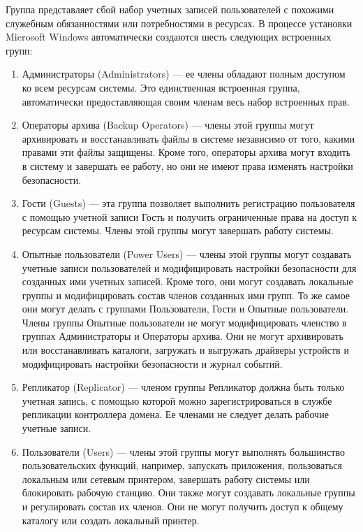 Группа  представляет сбой набор учетных записей пользователей с похожими служебным
обязанностями или потребностями в ресурсах. В процессе установки Microsoft Windows
автоматически создаются шесть следующих встроенных групп:
\begin{enumerate}

\item Администраторы (Administrators) --- ее члены обладают полным доступом
ко всем ресурсам системы. Это единственная встроенная группа,
автоматически предоставляющая своим членам весь набор встроенных прав.

\item Операторы архива (Backup Operators) --- члены этой группы могут
архивировать и восстанавливать файлы в системе независимо от того,
какими правами эти файлы защищены. Кроме того, операторы архива могут
входить в систему и завершать ее работу,
но они не имеют права изменять настройки безопасности.

\item Гости (Guests) --- эта группа позволяет выполнить регистрацию
пользователя с помощью учетной записи Гость и получить ограниченные
права на доступ к ресурсам системы.
Члены этой группы могут завершать работу системы.

\item Опытные пользователи (Power Users) --- члены этой группы могут
создавать учетные записи пользователей и модифицировать настройки безопасности
для созданных ими учетных записей. Кроме того, они могут создавать
локальные группы и модифицировать состав членов созданных ими групп.
То же самое они могут делать с группами Пользователи, Гости и Опытные пользователи.
Члены группы Опытные пользователи не могут модифицировать членство в группах
Администраторы и Операторы архива. Они не могут архивировать или восстанавливать
каталоги, загружать и выгружать драйверы устройств и
модифицировать настройки безопасности и журнал событий.

\item Репликатор (Replicator) --- членом группы Репликатор должна
быть только учетная запись, с помощью которой можно зарегистрироваться
в службе репликации контроллера домена. Ее членами не следует
делать рабочие учетные записи.

\item Пользователи (Users) --- члены этой группы могут выполнять большинство
пользовательских функций, например, запускать приложения, пользоваться локальным
или сетевым принтером, завершать работу системы или блокировать рабочую станцию.
Они также могут создавать локальные группы и регулировать состав их членов.
Они не могут получить доступ к общему каталогу или создать локальный принтер.
\end{enumerate}


